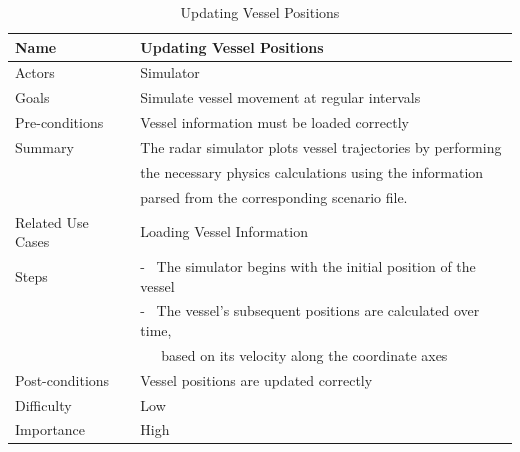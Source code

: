 \documentclass[12pt]{article}
\begin{document}
\begin{table}[ht]
\centering
   \begin{tabular}{|l|l|}
        \hline
        {\large Name} & {\large Updating Vessel Positions} \\
        \hline\hline
        Actors & Simulator\\
        \hline
        Goals & Simulate vessel movement at regular intervals\\
        \hline
        Pre-conditions & Vessel information must be loaded correctly\\
        \hline
        Summary & The radar simulator plots vessel trajectories by performing\\
         & the necessary physics calculations using the information\\
         & parsed from the corresponding scenario file.\\
        \hline
        Related Use Cases & Loading Vessel Information\\
        \hline
        Steps & - \ The simulator begins with the initial position of the vessel\\
         & - \ The vessel’s subsequent positions are calculated over time,\\
         & \ \ \ based on its velocity along the coordinate axes\\
        \hline
        Post-conditions & Vessel positions are updated correctly\\
        \hline
        Difficulty & Low\\
        \hline
        Importance & High\\
        \hline
    \end{tabular}
\caption{Updating Vessel Positions}
\end{table}
\end{document}
